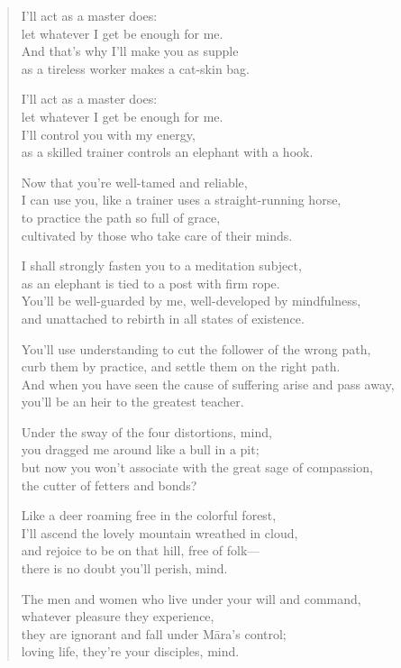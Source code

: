 \documentclass[12pt,openany]{book}%
\begin{document}
\begin{verse}
I’ll act as a master does: \\
let whatever I get be enough for me. \\
And that’s why I’ll make you as supple \\
as a tireless worker makes a cat-skin bag. 

I’ll act as a master does: \\
let whatever I get be enough for me. \\
I’ll control you with my energy, \\
as a skilled trainer controls an elephant with a hook. 

Now that you’re well-tamed and reliable, \\
I can use you, like a trainer uses a straight-running horse, \\
to practice the path so full of grace, \\
cultivated by those who take care of their minds. 

I shall strongly fasten you to a meditation subject, \\
as an elephant is tied to a post with firm rope. \\
You’ll be well-guarded by me, well-developed by mindfulness, \\
and unattached to rebirth in all states of existence. 

You’ll use understanding to cut the follower of the wrong path, \\
curb them by practice, and settle them on the right path. \\
And when you have seen the cause of suffering arise and pass away, \\
you’ll be an heir to the greatest teacher. 

Under the sway of the four distortions, mind, \\
you dragged me around like a bull in a pit; \\
but now you won’t associate with the great sage of compassion, \\
the cutter of fetters and bonds? 

Like a deer roaming free in the colorful forest, \\
I’ll ascend the lovely mountain wreathed in cloud, \\
and rejoice to be on that hill, free of folk—\\
there is no doubt you’ll perish, mind. 

The men and women who live under your will and command, \\
whatever pleasure they experience, \\
they are ignorant and fall under \textsanskrit{Māra}’s control; \\
loving life, they’re your disciples, mind. 

%
\end{verse}
\end{document}

